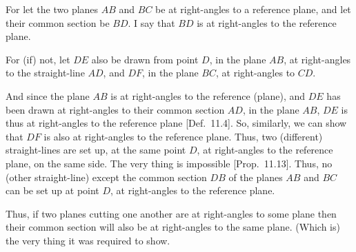 \begin{Parallel}{}{}
{For let the two planes $AB$ and $BC$ be at right-angles to a reference
plane, and let their common section be $BD$. I say that $BD$ is at right-angles to the reference plane.

For (if) not, let $DE$ also be drawn from point $D$,  in the plane
$AB$, at right-angles to the straight-line $AD$, and $DF$, in the plane $BC$, at right-angles to $CD$.

And since the plane $AB$ is at right-angles to the reference (plane),
and $DE$ has been drawn at right-angles to their common section $AD$,
in the plane $AB$, $DE$ is thus at right-angles to the reference 
plane [Def.~11.4]. So, similarly, we can show that
$DF$ is also at right-angles to the reference plane. Thus, two (different) straight-lines
are set up, at the same point $D$, at right-angles to the reference plane,
on the same side. The very thing is impossible [Prop.~11.13]. Thus, no (other straight-line) except the common section
$DB$ of the planes $AB$ and $BC$ can be set up at point $D$,
at right-angles to the reference plane.

Thus, if two planes cutting one another are at right-angles to some plane then their common section will also be at right-angles to the
same plane. (Which is) the very thing it was required to show.}
\end{Parallel}

